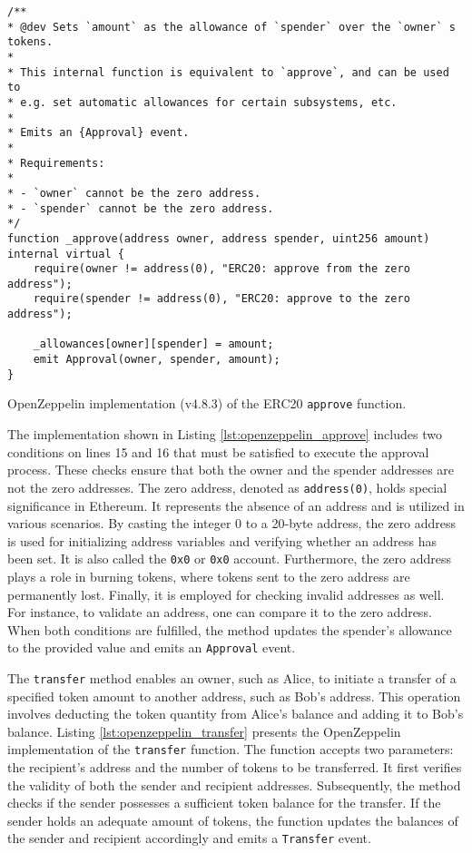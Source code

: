 \begin{listing}[!ht]
    \begin{verbatim}
/**
* @dev Sets `amount` as the allowance of `spender` over the `owner` s tokens.
*
* This internal function is equivalent to `approve`, and can be used to
* e.g. set automatic allowances for certain subsystems, etc.
*
* Emits an {Approval} event.
*
* Requirements:
*
* - `owner` cannot be the zero address.
* - `spender` cannot be the zero address.
*/
function _approve(address owner, address spender, uint256 amount) internal virtual {
    require(owner != address(0), "ERC20: approve from the zero address");
    require(spender != address(0), "ERC20: approve to the zero address");

    _allowances[owner][spender] = amount;
    emit Approval(owner, spender, amount);
}
    \end{verbatim}
    \caption{OpenZeppelin implementation (v4.8.3) of the ERC20 \texttt{approve} function.}
    \label{lst:openzeppelin_approve}
\end{listing}

The implementation shown in Listing \ref{lst:openzeppelin_approve} includes two conditions on lines 15 and 16 that must be satisfied to execute the approval process. These checks ensure that both the owner and the spender addresses are not the zero addresses.
The zero address, denoted as \texttt{address(0)}, holds special significance in Ethereum. It represents the absence of an address and is utilized in various scenarios. By casting the integer 0 to a 20-byte address, the zero address is used for initializing address variables and verifying whether an address has been set. It is also called the \texttt{0x0} or \texttt{0x0} account.
Furthermore, the zero address plays a role in burning tokens, where tokens sent to the zero address are permanently lost. Finally, it is employed for checking invalid addresses as well. For instance, to validate an address, one can compare it to the zero address. When both conditions are fulfilled, the method updates the spender's allowance to the provided value and emits an \texttt{Approval} event.

The \texttt{transfer} method enables an owner, such as Alice, to initiate a transfer of a specified token amount to another address, such as Bob's address. This operation involves deducting the token quantity from Alice's balance and adding it to Bob's balance.
Listing \ref{lst:openzeppelin_transfer} presents the OpenZeppelin implementation of the \texttt{transfer} function. The function accepts two parameters: the recipient's address and the number of tokens to be transferred. It first verifies the validity of both the sender and recipient addresses. Subsequently, the method checks if the sender possesses a sufficient token balance for the transfer. If the sender holds an adequate amount of tokens, the function updates the balances of the sender and recipient accordingly and emits a \texttt{Transfer} event.

